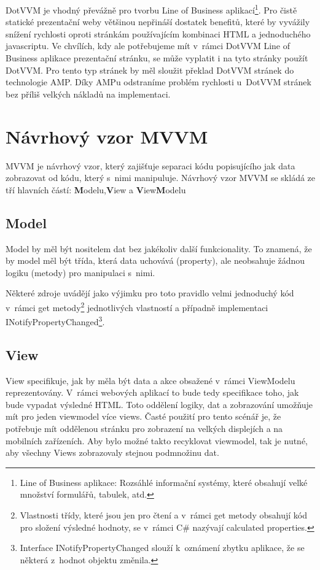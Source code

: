 DotVVM je vhodný převážně pro tvorbu Line of Business aplikací\footnote{Line of Business aplikace: Rozsáhlé informační systémy, které obsahují velké množství formulářů, tabulek, atd.}\cite{DotVVMIntro}. Pro čistě statické prezentační weby většinou nepřináší dostatek benefitů, které by vyvážily snížení rychlosti oproti stránkám používajícím kombinaci HTML a jednoduchého javascriptu. Ve chvílích, kdy ale potřebujeme mít v~rámci DotVVM Line of Business aplikace prezentační stránku, se může vyplatit i na tyto stránky použít DotVVM. Pro tento typ stránek by měl sloužit překlad DotVVM stránek do technologie AMP. Díky AMPu odstraníme problém rychlosti u~DotVVM stránek bez příliš velkých nákladů na implementaci.

\section{Návrhový vzor MVVM}
MVVM je návrhový vzor, který zajišťuje separaci kódu popisujícího jak data zobrazovat od kódu, který s~nimi manipuluje. Návrhový vzor MVVM se skládá ze tří hlavních částí: \textbf{M}odelu,\textbf{V}iew a \textbf{V}iew\textbf{M}odelu

\subsection*{Model}
Model by měl být nositelem dat bez jakékoliv další funkcionality. To znamená, že by model měl být třída, která data uchovává (property), ale neobsahuje žádnou logiku (metody) pro manipulaci s~nimi.

Některé zdroje uvádějí jako výjimku pro toto pravidlo velmi jednoduchý kód v~rámci get metody\footnote{Vlastnosti třídy, které jsou jen pro čtení a v~rámci get metody obsahují kód pro složení výsledné hodnoty, se v~rámci C# nazývají calculated properties.} jednotlivých vlastností a případně implementaci INotifyPropertyChanged\footnote{Interface INotifyPropertyChanged slouží k~oznámení zbytku aplikace, že se některá z~hodnot objektu změnila.}.

\subsection*{View}
View specifikuje, jak by měla být data a akce obsažené v~rámci ViewModelu reprezentovány. V~rámci webových aplikací to bude tedy specifikace toho, jak bude vypadat výsledné HTML. Toto oddělení logiky, dat a zobrazování umožňuje mít pro jeden viewmodel více views. Časté použití pro tento scénář je, že potřebuje mít oddělenou stránku pro zobrazení na velkých displejích a na mobilních zařízeních. Aby bylo možné takto recyklovat viewmodel, tak je nutné, aby všechny Views zobrazovaly stejnou podmnožinu dat.
